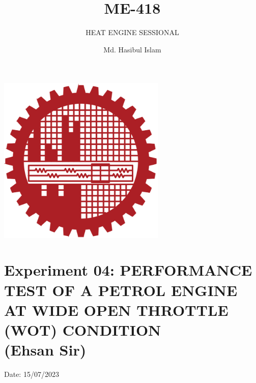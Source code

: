 \documentclass{article}
\title{ME-418}
\author{Md. Hasibul Islam}
\subtitle{HEAT ENGINE SESSIONAL}
\begin{document}
\begin{titlepage}
    \centering
    
    {\Huge\bfseries\maketitle}
    \vspace{2cm}
    \includegraphics[width=8cm]{institution_logo.jpg}
    \vfill
    \vspace*{2cm}
\end{titlepage}

\tableofcontents 
\pagebreak

\section{Experiment 04: PERFORMANCE TEST OF A PETROL ENGINE AT WIDE
OPEN THROTTLE (WOT) CONDITION \\ (Ehsan Sir)} 
\hfill Date: 15/07/2023
\end{document}
